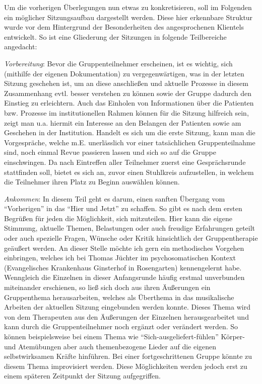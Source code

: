 Um die vorherigen Überlegungen nun etwas zu konkretisieren, soll im Folgenden ein möglicher Sitzungsaufbau dargestellt werden. Diese hier erkennbare Struktur wurde vor dem Hintergrund der Besonderheiten des angesprochenen Klientels entwickelt. So ist eine Gliederung der Sitzungen in folgende Teilbereiche angedacht:

\emph{Vorbereitung}:
Bevor die Gruppenteilnehmer erscheinen, ist es wichtig, sich (mithilfe der eigenen Dokumentation) zu vergegenwärtigen, was in der letzten Sitzung geschehen ist, um an diese anschließen und aktuelle Prozesse in diesem Zusammenhang evtl. besser verstehen zu können sowie der Gruppe dadurch den Einstieg zu erleichtern. Auch das Einholen von Informationen über die Patienten bzw. Prozesse im institutionellen Rahmen können für die Sitzung hilfreich sein, zeigt man u.a. hiermit ein Interesse an den Belangen der Patienten sowie am Geschehen in der Institution. Handelt es sich um die erste Sitzung, kann man die Vorgespräche, welche m.E. unerlässlich vor einer tatsächlichen Gruppenteilnahme sind, noch einmal Revue passieren lassen und sich so auf die Gruppe einschwingen.
Da nach Eintreffen aller Teilnehmer zuerst eine Gesprächsrunde stattfinden soll, bietet es sich an, zuvor einen Stuhlkreis aufzustellen, in welchem die Teilnehmer ihren Platz zu Beginn auswählen können. 

\emph{Ankommen}:
In diesem Teil geht es darum, einen sanften Übergang vom "`Vorherigen"' in das "`Hier und Jetzt"' zu schaffen. So gibt es nach dem ersten Begrüßen für jeden die Möglichkeit, sich mitzuteilen. Hier kann die eigene Stimmung, aktuelle Themen, Belastungen oder auch freudige Erfahrungen geteilt oder auch spezielle Fragen, Wünsche oder Kritik hinsichtlich der Gruppentherapie geäußert werden. An dieser Stelle möchte ich gern ein methodisches Vorgehen einbringen, welches ich bei Thomas Jüchter im psychosomatischen Kontext (Evangelisches Krankenhaus Ginsterhof in Rosengarten) kennengelernt habe. Wenngleich die Einzelnen in dieser Anfangsrunde häufig erstmal unverbunden miteinander erschienen, so ließ sich doch aus ihren Äußerungen ein Gruppenthema herausarbeiten, welches als Überthema in das musikalische Arbeiten der aktuellen Sitzung eingebunden werden konnte. Dieses Thema wird von dem Therapeuten aus den Äußerungen der Einzelnen herausgearbeitet und kann durch die Gruppenteilnehmer noch ergänzt oder verändert werden. So können beispielsweise bei einem Thema wie "`Sich-ausgeliefert-fühlen"' Körper- und Atemübungen aber auch themenbezogene Lieder auf die eigenen selbstwirksamen Kräfte hinführen. Bei einer fortgeschrittenen Gruppe könnte zu diesem Thema improvisiert werden. Diese Möglichkeiten werden jedoch erst zu einem späteren Zeitpunkt der Sitzung aufgegriffen. 

